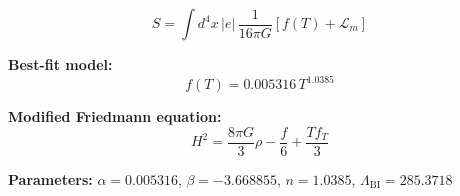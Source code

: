 
\begin{equation}
  S = \int d^4x \, |e| \, \frac{1}{16\pi G} \left[ f(T) + \mathcal{L}_m \right]
\end{equation}

\textbf{Best-fit model:}
\begin{equation}
  f(T) = 0.005316 \, T^{1.0385}
\end{equation}

\textbf{Modified Friedmann equation:}
\begin{equation}
  H^2 = \frac{8\pi G}{3} \rho - \frac{f}{6} + \frac{T f_T}{3}
\end{equation}

\textbf{Parameters:}
$\alpha = 0.005316$, \quad
$\beta = -3.668855$, \quad
$n = 1.0385$, \quad
$\Lambda_{\text{BI}} = 285.3718$